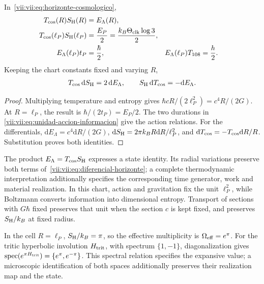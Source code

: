 \begin{theorem}
\label{vii:vii:thm:celda-media-accion}
In~\eqref{vii:vii:eq:horizonte-cosmologico},
\begin{align}
 T_{\rm cos}(R)S_{\rm H}(R)&=E_\Lambda(R),\\
 T_{\rm cos}(\ell_P)S_{\rm H}(\ell_P)
 &=\frac{E_P}{2}=\frac{k_B\Theta_{\rm clk}\log3}{2},\\
 E_\Lambda(\ell_P)t_P&=\frac{\hbar}{2},&
 E_\Lambda(\ell_P)T_{108}&=\frac h2.
 \label{vii:vii:eq:media-accion-horizonte}
\end{align}
Keeping the chart constants fixed and varying \(R\),
\begin{equation}
 T_{\rm cos}\,\mathrm dS_{\rm H}=2\,\mathrm dE_\Lambda,
 \qquad S_{\rm H}\,\mathrm dT_{\rm cos}=-\mathrm dE_\Lambda.
 \label{vii:vii:eq:diferencial-horizonte}
\end{equation}
\end{theorem}
\begin{proof}
Multiplying temperature and entropy gives
\(\hbar cR/(2\ell_P^2)=c^4R/(2G)\).
At \(R=\ell_P\), the result is
\(\hbar/(2t_P)=E_P/2\). The two durations in
\eqref{vii:vii:eq:unidad-accion-informacion} give the action relations.
For the differentials,
\(\mathrm dE_\Lambda=c^4\mathrm dR/(2G)\),
\(\mathrm dS_{\rm H}=2\pi k_BR\mathrm dR/\ell_P^2\), and
\(\mathrm dT_{\rm cos}=-T_{\rm cos}\mathrm dR/R\).
Substitution proves both identities.
\end{proof}

The product \(E_\Lambda=T_{\rm cos}S_{\rm H}\) expresses a
state identity. Its radial variations preserve both terms
of~\eqref{vii:vii:eq:diferencial-horizonte}; a complete thermodynamic interpretation
additionally specifies the corresponding time generator, work and
material realization. In this chart, action and
gravitation fix the unit \(\ell_P^2\), while Boltzmann converts
information into dimensional entropy. Transport of sections with
\(G\hbar\) fixed preserves that unit when the section \(c\) is
kept fixed, and preserves \(S_{\rm H}/k_B\) at fixed radius.

In the cell \(R=\ell_P\), \(S_{\rm H}/k_B=\pi\), so
the effective multiplicity is \(\Omega_{\rm eff}=e^\pi\).
For the tritic hyperbolic involution \(H_{\rm trit}\), with spectrum
\(\{1,-1\}\), diagonalization gives
\(\operatorname{spec}(e^{\pi H_{\rm trit}})=\{e^\pi,e^{-\pi}\}\).
This spectral relation specifies the expansive value; a microscopic
identification of both spaces additionally preserves their realization
map and the state.

